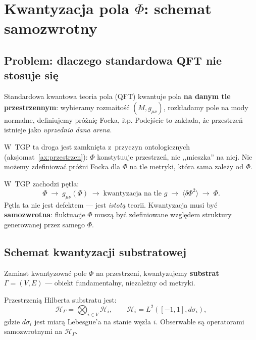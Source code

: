 \section{Kwantyzacja pola $\Phi$: schemat samozwrotny}%
\label{app:kwantyzacja}

\subsection{Problem: dlaczego standardowa QFT nie stosuje się}%
\label{app:E-problem}

Standardowa kwantowa teoria pola (QFT) kwantuje pola
\textbf{na danym tle przestrzennym}: wybieramy rozmaitość
$(M, g_{\mu\nu})$, rozkładamy pole na mody normalne,
definiujemy próżnię Focka, itp. Podejście to zakłada,
że przestrzeń istnieje jako \emph{uprzednio dana arena}.

W~TGP ta droga jest zamknięta z~przyczyn ontologicznych
(aksjomat~\ref{ax:przestrzen}): $\Phi$ konstytuuje przestrze\'n,
nie ,,mieszka'' na niej. Nie możemy zdefiniować próżni Focka
dla $\Phi$ na tle metryki, która sama zależy od $\Phi$.

\begin{remark}
W~TGP zachodzi pętla:
\[
    \Phi \;\longrightarrow\; g_{\mu\nu}(\Phi)
    \;\longrightarrow\; \text{kwantyzacja na tle }g
    \;\longrightarrow\; \langle\delta\Phi^2\rangle
    \;\longrightarrow\; \Phi.
\]
Pętla ta nie jest defektem --- jest \emph{istotą} teorii.
Kwantyzacja musi być \textbf{samozwrotna}: fluktuacje $\Phi$
muszą być zdefiniowane względem struktury generowanej przez
samego $\Phi$.
\end{remark}

\subsection{Schemat kwantyzacji substratowej}%
\label{app:E-scheme}

Zamiast kwantyzować pole $\Phi$ na przestrzeni,
kwantyzujemy \textbf{substrat} $\Gamma = (V, E)$ ---
obiekt fundamentalny, niezależny od metryki.

\begin{definition}%
\label{def:hilbert-substrate}
Przestrzenią Hilberta substratu jest:
\begin{equation}\label{eq:H-substrate}
    \mathcal{H}_\Gamma
    = \bigotimes_{i \in V} \mathcal{H}_i,
    \qquad
    \mathcal{H}_i = L^2([-1, 1], d\sigma_i),
\end{equation}
gdzie $d\sigma_i$ jest miarą Lebesgue'a na stanie węzła $i$.
Obserwable są operatorami samozwrotnymi na $\mathcal{H}_\Gamma$.
\end{definition}

